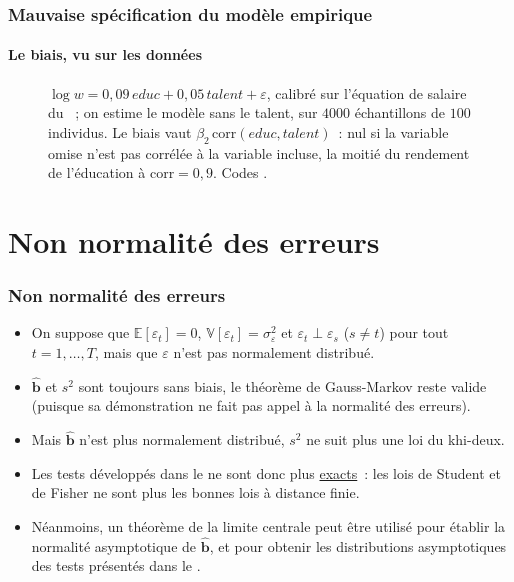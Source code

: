 \documentclass[10pt]{beamer}
\begin{document}
\begin{frame}[c]
  \frametitle{Mauvaise spécification du modèle empirique}
  \framesubtitle{Le biais, vu sur les données}

  \begin{figure}
    \centering
    \scalebox{.42}{}
    \caption{$\log w = 0{,}09\,educ + 0{,}05\,talent + \varepsilon$, calibré sur
      l'équation de salaire du ~; on estime le modèle sans le talent,
      sur $4000$ échantillons de $100$ individus. Le biais vaut
      $\beta_2\,\mathrm{corr}(educ,talent)$~: nul si la variable omise n'est pas
      corrélée à la variable incluse, la moitié du rendement de l'éducation à
      $\mathrm{corr}=0{,}9$. Codes .}
  \end{figure}

\end{frame}


\section{Non normalité des erreurs}

\begin{frame}
  \frametitle{Non normalité des erreurs}

  \begin{itemize}

  \item On suppose que $\mathbb E\left[ \varepsilon_t \right] = 0$, $\mathbb V\left[ \varepsilon_t \right] = \sigma_{\varepsilon}^2$ et $\varepsilon_t\perp\varepsilon_s$ ($s\neq t$) pour tout $t=1,\dots,T$, mais que $\varepsilon$ n'est pas normalement distribué.\newline

  \item $\hat{\mathbf b}$ et $s^2$ sont toujours sans biais, le théorème de Gauss-Markov reste valide (puisque sa démonstration ne fait pas appel à la normalité des erreurs).\newline

  \item Mais  $\hat{\mathbf b}$ n'est plus normalement distribué, $s^2$ ne suit plus une loi du khi-deux.\newline

  \item Les tests développés dans le  ne sont donc plus \underline{exacts}~: les lois de Student et de Fisher ne sont plus les bonnes lois à distance finie.\newline

  \item Néanmoins, un théorème de la limite centrale peut être utilisé pour établir la normalité asymptotique de $\hat{\mathbf b}$, et pour obtenir les distributions asymptotiques des tests présentés dans le .

  \end{itemize}

\end{frame}
\end{document}
